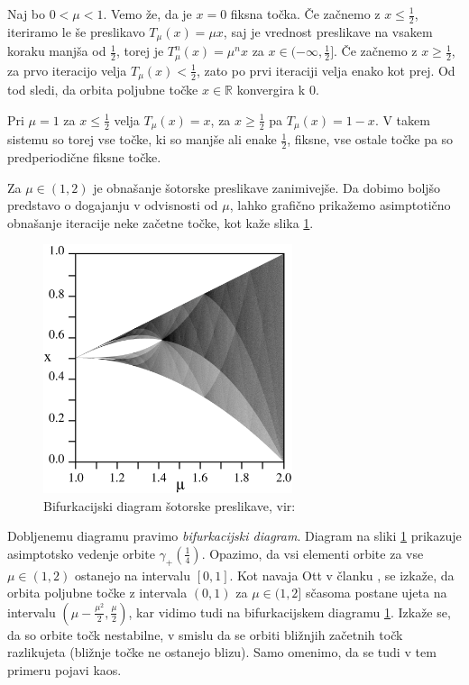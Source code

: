 \documentclass{isrmdelo}
\newcommand{\R}{\mathbb R}
\begin{document}
\medskip

Naj bo $0 < \mu < 1$. Vemo že, da je $x=0$ fiksna točka. Če začnemo z $x \leq \frac{1}{2}$, iteriramo le še preslikavo $T_{\mu}(x) = \mu x$, saj je vrednost preslikave na vsakem koraku manjša od $\frac{1}{2}$, torej je $T_\mu^n(x) = \mu^n x$ za $x \in (-\infty, \frac{1}{2}]$. Če začnemo z $x \geq \frac{1}{2}$, za prvo iteracijo velja $T_\mu(x) < \frac{1}{2}$, zato po prvi iteraciji velja enako kot prej. Od tod sledi, da orbita poljubne točke $x \in \R$ konvergira k $0$.

\medskip

Pri $\mu = 1$ za $x \leq \frac{1}{2}$ velja $T_{\mu}(x) = x$, za $x \geq \frac{1}{2}$ pa $T_{\mu}(x) = 1 - x$. V takem sistemu so torej vse točke, ki so manjše ali enake $\frac{1}{2}$, fiksne, vse ostale točke pa so predperiodične fiksne točke.

\medskip

Za $\mu \in (1, 2)$ je obnašanje šotorske preslikave zanimivejše. Da dobimo boljšo predstavo o dogajanju v odvisnosti od $\mu$, lahko grafično prikažemo asimptotično obnašanje iteracije neke začetne točke, kot kaže slika \ref{pic:tent-bifurcation}.
\begin{figure}[h!]
\begin{center}
\includegraphics[width=0.65\textwidth]{img/tent_bifurcation.png}
\end{center}
\caption{Bifurkacijski diagram šotorske preslikave, vir: \cite{tentbif}}
\label{pic:tent-bifurcation}
\end{figure}

Dobljenemu diagramu pravimo \emph{bifurkacijski diagram}. Diagram na sliki \ref{pic:tent-bifurcation} prikazuje asimptotsko vedenje orbite $\gamma_{+}(\frac{1}{4})$. Opazimo, da vsi elementi orbite za vse $\mu \in (1,2)$ ostanejo na intervalu $[0,1]$. Kot navaja Ott v članku \cite{ott}, se izkaže, da orbita poljubne točke z intervala $(0,1)$ za $\mu \in (1,2]$ sčasoma postane ujeta na intervalu $(\mu - \frac{\mu^2}{2}, \frac{\mu}{2})$, kar vidimo tudi na bifurkacijskem diagramu \ref{pic:tent-bifurcation}. Izkaže se, da so orbite točk nestabilne, v smislu da se orbiti bližnjih začetnih točk razlikujeta (bližnje točke ne ostanejo blizu). Samo omenimo, da se tudi v tem primeru pojavi kaos.
\end{document}
